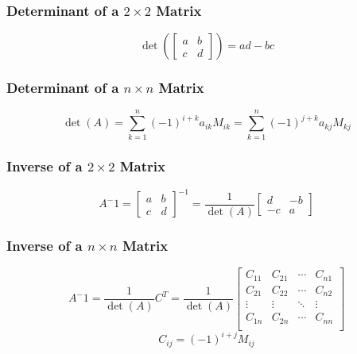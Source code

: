\documentclass{article}
\begin{document}
        \subsubsection {Determinant of a $2 \times 2$ Matrix}
        \begin{equation}
            \det(\begin{bmatrix} a & b \\ c & d \end{bmatrix}) = ad - bc
        \end{equation}

        \subsubsection {Determinant of a $n \times n$ Matrix}
        \begin{equation}
            \det(A) = \sum^n_{k=1} (-1)^{i+k} a_{ik} M_{ik} = \sum^n_{k=1} (-1)^{j+k} a_{kj} M_{kj}
        \end{equation}

        \subsubsection {Inverse of a $2 \times 2$ Matrix}
        \begin{equation}
            A^-1 = \begin{bmatrix} a & b \\ c & d \end{bmatrix}^{-1} = \frac 1 {\det(A)} \begin{bmatrix} d & -b \\ -c & a\end{bmatrix}
        \end{equation}

        \subsubsection {Inverse of a $n \times n$ Matrix}
        \begin{equation}
            A^-1 = \frac 1 {\det(A)} C^T = \frac 1 {\det(A)} \begin{bmatrix} 
                C_{11} & C_{21} & \cdots & C_{n1} \\ 
                C_{21} & C_{22} & \cdots & C_{n2} \\
                \vdots & \vdots & \ddots & \vdots \\
                C_{1n} & C_{2n} & \cdots & C_{nn} \\
            \end{bmatrix}
        \end{equation}
        \begin{equation}
            C_{ij} = (-1)^{i+j}M_{ij}
        \end{equation}
\end{document}
